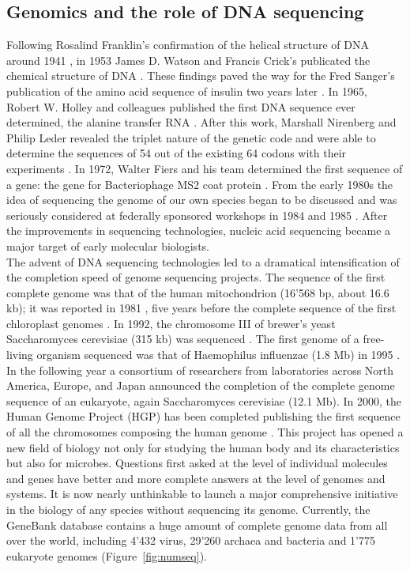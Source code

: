 \subsection{Genomics and the role of DNA sequencing\label{par:genomics}}
Following Rosalind Franklin's confirmation of the helical structure of DNA around 1941 \cite{maddox2012rosalind}, in 1953 James D. Watson and Francis Crick's publicated the chemical structure of DNA \cite{watson1953molecular}. These findings paved the way for the Fred Sanger's publication of the amino acid sequence of insulin two years later \cite{sanger1953amino}. In 1965, Robert W. Holley and colleagues published the first DNA sequence ever determined, the alanine transfer RNA \cite{holley1965nucleotide}. After this work, Marshall Nirenberg and Philip Leder revealed the triplet nature of the genetic code and were able to determine the sequences of 54 out of the existing 64 codons with their experiments \cite{nirenberg1965rna}. In 1972, Walter Fiers and his team determined the first sequence of a gene: the gene for Bacteriophage MS2 coat protein \cite{jou1972nucleotide}. From the early 1980s the idea of sequencing the genome of our own species began to be discussed and was seriously considered at federally sponsored workshops in 1984 and 1985 \cite{lambright2002managing}. After the improvements in sequencing technologies, nucleic acid sequencing became a major target of early molecular biologists.\\
The advent of DNA sequencing technologies led to a dramatical intensification of the completion speed of genome sequencing projects. The sequence of the first complete genome was that of the human mitochondrion (16'568 bp, about 16.6 kb); it was reported in 1981 \cite{anderson1981sequence}, five years before the complete sequence of the first chloroplast genomes \cite{shinozaki1986complete}. In 1992, the chromosome III of brewer's yeast Saccharomyces cerevisiae (315 kb) was sequenced \cite{oliver1992complete}. The first genome of a free-living organism sequenced was that of Haemophilus influenzae (1.8 Mb) in 1995 \cite{fleischmann1995whole}. In the following year a consortium of researchers from laboratories across North America, Europe, and Japan announced the completion of the complete genome sequence of an eukaryote, again Saccharomyces cerevisiae (12.1 Mb). In 2000, the Human Genome Project (HGP) has been completed publishing the first sequence of all the chromosomes composing the human genome \cite{collins1998new}. This project has opened a new field of biology not only for studying the human body and its characteristics but also for microbes. Questions first asked at the level of individual molecules and genes have better and more complete answers at the level of genomes and systems. It is now nearly unthinkable to launch a major comprehensive initiative in the biology of any species without sequencing its genome. Currently, the GeneBank database contains a huge amount of complete genome data from all over the world, including 4'432 virus, 29'260 archaea and bacteria and 1'775 eukaryote genomes (Figure~\ref{fig:numseq}).\\

